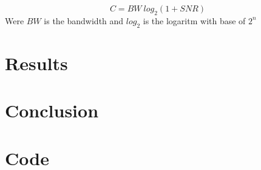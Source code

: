 \documentclass[twocolumn]{article}
\begin{document}
\begin{equation}
\label{shannon}
C=BW~log_2(1+SNR)
\end{equation}
Were $BW$ is the bandwidth and $log_2$ is the logaritm with base of $2^n$

\section{Results}




\section{Conclusion}



\onecolumn
\appendix
\section{Code}

\end{document}
